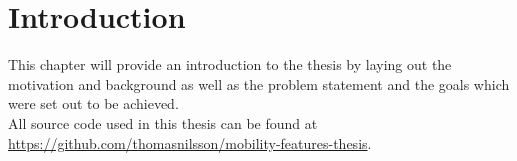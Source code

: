 \chapter{Introduction}
This chapter will provide an introduction to the thesis by laying out the motivation and background as well as the problem statement and the goals which were set out to be achieved.\\

All source code used in this thesis can be found at \url{https://github.com/thomasnilsson/mobility-features-thesis}.







